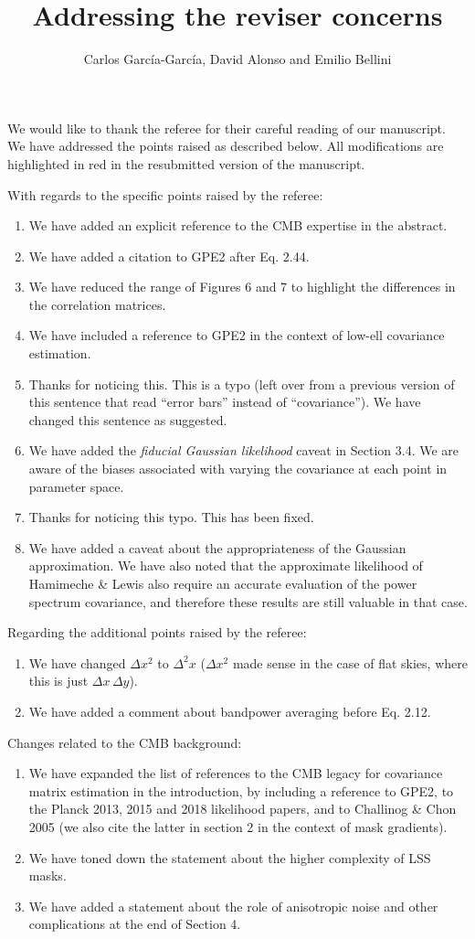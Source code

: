 \documentclass[a4paper]{article}
\title{Addressing the reviser concerns}
\author{Carlos Garc\'ia-Garc\'ia, David Alonso and Emilio Bellini}
\begin{document}
\maketitle
We would like to thank the referee for their careful reading of our manuscript.
We have addressed the points raised as described below. All modifications are
highlighted in red in the resubmitted version of the manuscript.

With regards to the specific points raised by the referee:
\begin{enumerate}
  \item We have added an explicit reference to the CMB expertise in the abstract.
  \item We have added a citation to GPE2 after Eq. 2.44.
  \item We have reduced the range of Figures 6 and 7 to highlight the differences in the correlation matrices.
  \item We have included a reference to GPE2 in the context of low-ell covariance estimation.
  \item Thanks for noticing this. This is a typo (left over from a previous version of this sentence that read ``error bars'' instead of ``covariance''). We have changed this sentence as suggested.
  \item We have added the {\sl fiducial Gaussian likelihood} caveat in Section 3.4. We are aware of the biases associated with varying the covariance at each point in parameter space.
  \item Thanks for noticing this typo. This has been fixed.
  \item We have added a caveat about the appropriateness of the Gaussian approximation. We have also noted that the approximate likelihood of Hamimeche \& Lewis also require an accurate evaluation of the power spectrum covariance, and therefore these results are still valuable in that case.
\end{enumerate}

Regarding the additional points raised by the referee:
\begin{enumerate}
 \item We have changed $\Delta x^2$ to $\Delta^2 x$ ($\Delta x^2$ made sense in the case of flat skies, where this is just $\Delta x\,\Delta y$).
 \item We have added a comment about bandpower averaging before Eq. 2.12.
\end{enumerate}


Changes related to the CMB background:
\begin{enumerate}
  \item We have expanded the list of references to the CMB legacy for covariance matrix estimation in the introduction, by including a reference to GPE2, to the Planck 2013, 2015 and 2018 likelihood papers, and to Challinog \& Chon 2005 (we also cite the latter in section 2 in the context of mask gradients).
  \item We have toned down the statement about the higher complexity of LSS masks.
  \item We have added a statement about the role of anisotropic noise and other complications at the end of Section 4.
\end{enumerate}
\end{document}
